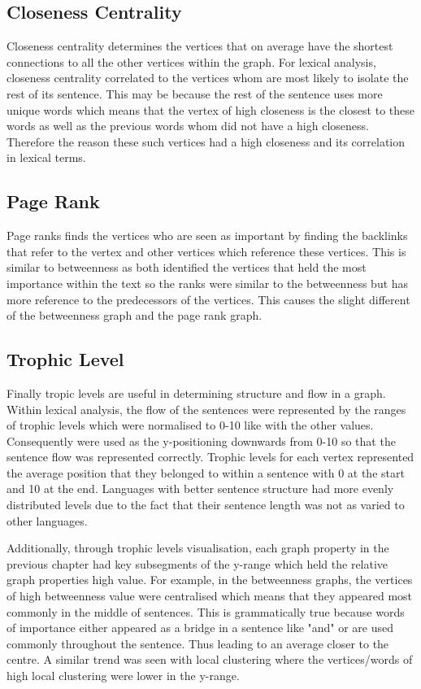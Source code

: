 \subsection{Closeness Centrality}
Closeness centrality determines the vertices that on average have the shortest connections to all the other vertices within the graph. For lexical analysis, closeness centrality correlated to the vertices whom are most likely to isolate the rest of its sentence. This may be because the rest of the sentence uses more unique words which means that the vertex of high closeness is the closest to these words as well as the previous words whom did not have a high closeness. Therefore the reason these such vertices had a high closeness and its correlation in lexical terms.

\subsection{Page Rank}
Page ranks finds the vertices who are seen as important by finding the backlinks that refer to the vertex and other vertices which reference these vertices. This is similar to betweenness as both identified the vertices that held the most importance within the text so the ranks were similar to the betweenness but has more reference to the predecessors of the vertices. This causes the slight different of the betweenness graph and the page rank graph.

\subsection{Trophic Level}
Finally tropic levels are useful in determining structure and flow in a graph. Within lexical analysis, the flow of the sentences were represented by the ranges of trophic levels which were normalised to 0-10 like with the other values. Consequently were used as the y-positioning downwards from 0-10 so that the sentence flow was represented correctly. Trophic levels for each vertex represented the average position that they belonged to within a sentence with 0 at the start and 10 at the end. Languages with better sentence structure had more evenly distributed levels due to the fact that their sentence length was not as varied to other languages. 

Additionally, through trophic levels visualisation, each graph property in the previous chapter had key subsegments of the y-range which held the relative graph properties high value. For example, in the betweenness graphs, the vertices of high betweenness value were centralised which means that they appeared most commonly in the middle of sentences. This is grammatically true because words of importance either appeared as a bridge in a sentence like "and" or are used commonly throughout the sentence. Thus leading to an average closer to the centre. A similar trend was seen with local clustering where the vertices/words of high local clustering were lower in the y-range.
\\

